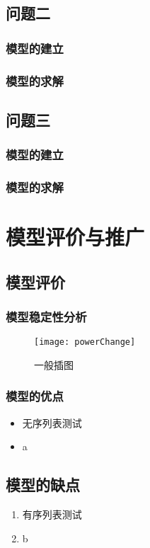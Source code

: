 \documentclass{cumcmthesis}
\begin{document}
\subsection{问题二}
\subsubsection{模型的建立}
\subsubsection{模型的求解}
\subsection{问题三}
\subsubsection{模型的建立}
\subsubsection{模型的求解}
\section{模型评价与推广}
\subsection{模型评价}
\subsubsection{模型稳定性分析}
\begin{figure}[!htbp]
    \centering
    \texttt{[image: powerChange]}
    \caption[]{一般插图}
\end{figure}
\subsubsection{模型的优点}
\begin{itemize}
    \item 无序列表测试
    \item a
\end{itemize}
\subsection{模型的缺点}
\begin{enumerate}
    \item 有序列表测试
    \item b
\end{enumerate}
\end{document}

